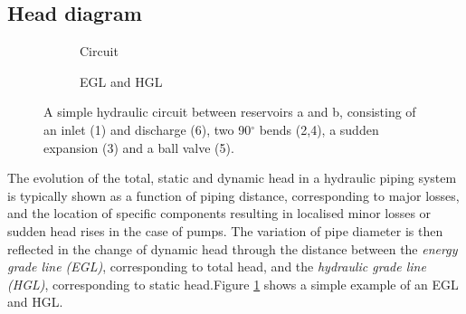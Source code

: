 

\subsection{Head diagram}

\begin{figure}
  \begin{subfigure}{\textwidth}
    \caption{Circuit}
  \end{subfigure}
  \begin{subfigure}{\textwidth}
    \centering{}
    \caption{EGL and HGL}
  \end{subfigure}
  \caption{A simple hydraulic circuit between reservoirs a and b,
    consisting of an inlet (1) and discharge (6), two 90$^\circ$ bends
    (2,4), a sudden expansion (3) and a ball valve (5).}
  \label{fig:headDiagramCircuit}
\end{figure}

The evolution of the total, static and dynamic head in a hydraulic
piping system is typically shown as a function of piping distance,
corresponding to major losses, and the location of specific components
resulting in localised minor losses or sudden head rises in the case
of pumps. The variation of pipe diameter is then reflected in the
change of dynamic head through the distance between the \emph{energy
  grade line (EGL)}, corresponding to total head, and the
\emph{hydraulic grade line (HGL)}, corresponding to static head.Figure
\ref{fig:headDiagramCircuit} shows a simple example of an EGL and HGL.

